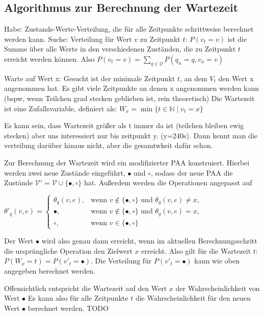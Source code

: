 \subsection{Algorithmus zur Berechnung der Wartezeit}

Habe: Zustands-Werte-Verteilung, die für alle Zeitpunkte schrittweise berechnet werden kann.
Suche: Verteilung für Wert $v$ zu Zeitpunkt $t$: $P(v_t = v) $ ist die Summe über alle Werte in den verschiedenen Zuständen, die zu Zeitpunkt $t$ erreicht werden können. Also $P(v_t = v)  = \sum_{q \in \mathcal{Q}} P(q_n = q, v_n = v)$

Warte auf Wert x: 
Gesucht ist der minimale Zeitpunkt $t$, an dem $V_t$ den Wert x angenommen hat. Es gibt viele Zeitpunkte an denen x angenommen werden kann (bspw, wenn Teilchen grad stecken geblieben ist, rein theoretisch) 
Die Wartezeit ist eine Zufallsvariable, definiert als: $W_x = \min\{t \in \mathbb{N}\mid v_t = x\}$

Es kann sein, dass Wartezeit größer als t immer da ist (teilchen bleiben ewig stecken) aber uns interessiert nur bis zeitpunkt y. (y=240s). Dann kennt man die verteilung darüber hinaus nicht, aber die gesamtwkeit dafür schon.

Zur Berechnung der Wartezeit wird ein modifizierter PAA konstruiert. Hierbei werden zwei neue Zustände eingeführt, $\bullet$ und $\circ$, sodass der neue PAA die Zustände $\mathcal{V}' = \mathcal{V} \cup \{\bullet, \circ\}$ hat. Außerdem werden die Operationen angepasst auf

$ \theta'_q(v,e)=
\begin{cases}
\theta_q(v,e), 	& \text{wenn } v \notin \{\bullet, \circ\} \text{ und } \theta_q(v,e) \neq x ,\\
\bullet,	& \text{wenn } v \notin \{\bullet, \circ\} \text{ und } \theta_q(v,e) = x ,  \\
\circ, 		& \text{wenn } v \in \{\bullet, \circ\}
\end{cases}$

Der Wert $\bullet$ wird also genau dann erreicht, wenn im aktuellen Berechnungsschritt die ursprüngliche Operation den Zielwert $x$ erreicht. Also gilt für die Wartezeit $t$: $P(W_x = t) = P(v'_t = \bullet)$.
Die Verteilung für $P(v'_t = \bullet)$ kann wie oben angegeben berechnet werden. 

Offensichtlich entspricht die Wartezeit auf den Wert $x$ der Wahrscheinlichkeit von Wert $\bullet$
Es kann also für alle Zeitpunkte $t$ die Wahrscheinlichkeit für den neuen Wert $\bullet$ berechnet werden.
TODO